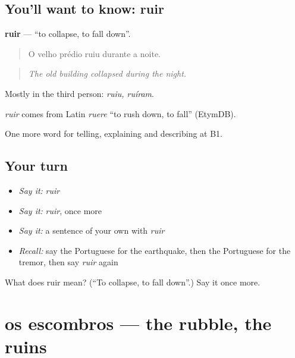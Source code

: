 \subsection*{You'll want to know: ruir}
\textbf{ruir} — \textquotedblleft{}to collapse, to fall down\textquotedblright{}.

\begin{quote}
O velho prédio ruiu durante a noite.
\end{quote}

\begin{quote}
\emph{The old building collapsed during the night.}
\end{quote}

Mostly in the third person: \emph{ruiu, ruíram}.

\begin{cousinweb}
\emph{ruir} comes from Latin \emph{ruere} \textquotedblleft{}to rush down, to fall\textquotedblright{} (EtymDB).
\end{cousinweb}

\begin{grammarlens}[title={What you've built}]
One more word for telling, explaining and describing at B1.
\end{grammarlens}

\subsection*{Your turn}
\begin{itemize}
\raggedright
  \item \emph{Say it:} \emph{ruir}
  \item \emph{Say it:} \emph{ruir}, once more
  \item \emph{Say it:} a sentence of your own with \emph{ruir}
  \item \emph{Recall:} say the Portuguese for the earthquake, then the Portuguese for the tremor, then say \emph{ruir} again
\end{itemize}

\begin{tcolorbox}[breakable,colback=teal!4,colframe=teal!35!black,title={Before you move on}]
What does ruir mean? (\textquotedblleft{}To collapse, to fall down\textquotedblright{}.) Say it once more.
\end{tcolorbox}
\section[os escombros]{os escombros — the rubble, the ruins}


